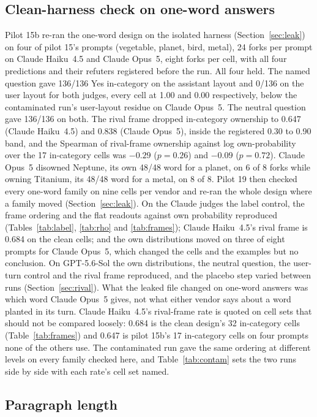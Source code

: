 \documentclass[twocolumn,10pt]{article}
\newcommand{\opus}{Claude Opus~5}
\newcommand{\haiku}{Claude Haiku~4.5}
\newcommand{\gpt}{GPT-5.6-Sol}
\begin{document}
\subsection{Clean-harness check on one-word answers}
\label{sec:clean}

Pilot 15b re-ran the one-word design on the isolated harness (Section~\ref{sec:leak}) on four of pilot 15's prompts (vegetable, planet, bird, metal), 24 forks per prompt on \haiku{} and \opus{}, eight forks per cell, with all four predictions and their refuters registered before the run. All four held. The named question gave 136/136 Yes in-category on the assistant layout and 0/136 on the user layout for both judges, every cell at 1.00 and 0.00 respectively, below the contaminated run's user-layout residue on \opus{}. The neutral question gave 136/136 on both. The rival frame dropped in-category ownership to 0.647 (\haiku{}) and 0.838 (\opus{}), inside the registered 0.30 to 0.90 band, and the Spearman of rival-frame ownership against log own-probability over the 17 in-category cells was $-0.29$ ($p=0.26$) and $-0.09$ ($p=0.72$). \opus{} disowned Neptune, its own 48/48 word for a planet, on 6 of 8 forks while owning Titanium, its 48/48 word for a metal, on 8 of 8. Pilot 19 then checked every one-word family on nine cells per vendor and re-ran the whole design where a family moved (Section~\ref{sec:leak}). On the Claude judges the label control, the frame ordering and the flat readouts against own probability reproduced (Tables~\ref{tab:label}, \ref{tab:rho} and \ref{tab:frames}); \haiku{}'s rival frame is 0.684 on the clean cells; and the own distributions moved on three of eight prompts for \opus{}, which changed the cells and the examples but no conclusion. On \gpt{} the own distributions, the neutral question, the user-turn control and the rival frame reproduced, and the placebo step varied between runs (Section~\ref{sec:rival}). What the leaked file changed on one-word answers was which word \opus{} gives, not what either vendor says about a word planted in its turn. \haiku{}'s rival-frame rate is quoted on cell sets that should not be compared loosely: 0.684 is the clean design's 32 in-category cells (Table~\ref{tab:frames}) and 0.647 is pilot 15b's 17 in-category cells on four prompts none of the others use. The contaminated run gave the same ordering at different levels on every family checked here, and Table~\ref{tab:contam} sets the two runs side by side with each rate's cell set named.

\subsection{Paragraph length}
\label{sec:para}
\end{document}
